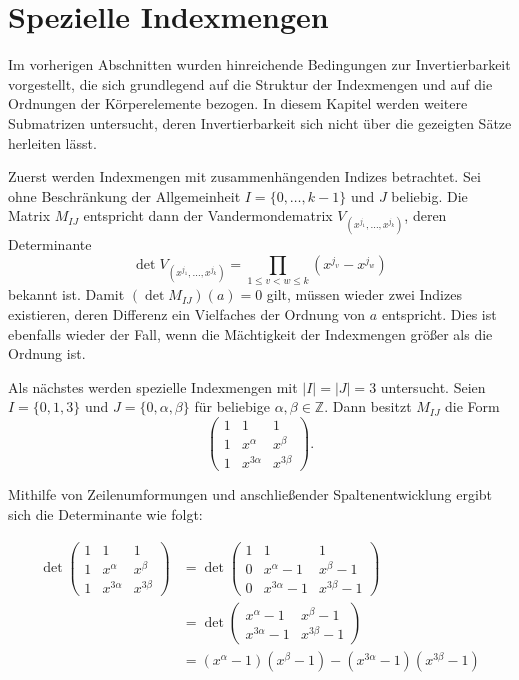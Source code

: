 \section{Spezielle Indexmengen}

Im vorherigen Abschnitten wurden hinreichende Bedingungen zur Invertierbarkeit vorgestellt, die sich grundlegend auf die Struktur der Indexmengen und auf die Ordnungen der Körperelemente bezogen. In diesem Kapitel werden weitere Submatrizen untersucht, deren Invertierbarkeit sich nicht über die gezeigten Sätze herleiten lässt.

Zuerst werden Indexmengen mit zusammenhängenden Indizes betrachtet. Sei ohne Beschränkung der Allgemeinheit $I = \{0,\dots,k-1\}$ und $J$ beliebig. Die Matrix $M_{IJ}$ entspricht dann der Vandermondematrix $V_{(x^{j_1},\dots,x^{j_k})}$, deren Determinante
\begin{equation*}
    \det V_{(x^{j_1},\dots,x^{j_k})} = \prod_{1\leq v<w\leq k} (x^{j_v} - x^{j_w})
\end{equation*}
bekannt ist. Damit $(\det M_{IJ})(a) = 0$ gilt, müssen wieder zwei Indizes existieren, deren Differenz ein Vielfaches der Ordnung von $a$ entspricht. Dies ist ebenfalls wieder der Fall, wenn die Mächtigkeit der Indexmengen größer als die Ordnung ist.


Als nächstes werden spezielle Indexmengen mit $|I| = |J| = 3$ untersucht. Seien $I = \{0, 1, 3\}$ und $J = \{0, \alpha, \beta\}$ für beliebige $\alpha,\beta \in \mathbb{Z}$. Dann besitzt $M_{IJ}$ die Form 
\begin{equation*}
    \begin{pmatrix}
        1 & 1 & 1 \\
        1 & x^{\alpha} & x^{\beta} \\
        1 & x^{3\alpha} & x^{3\beta}
    \end{pmatrix}.
\end{equation*}

Mithilfe von Zeilenumformungen und anschließender Spaltenentwicklung ergibt sich die Determinante wie folgt:

\begin{align*}
    \det \begin{pmatrix}
        1 & 1 & 1 \\
        1 & x^{\alpha} & x^{\beta} \\
        1 & x^{3\alpha} & x^{3\beta}
    \end{pmatrix}
    &= \det \begin{pmatrix}
        1 & 1 & 1 \\
        0 & x^{\alpha} -1 & x^{\beta} -1 \\
        0 & x^{3\alpha} -1 & x^{3\beta} -1
    \end{pmatrix} \\
    &= \det \begin{pmatrix}
        x^{\alpha} -1 & x^{\beta} -1 \\
        x^{3\alpha} -1 & x^{3\beta} -1
    \end{pmatrix} \\
    &= (x^{\alpha} -1)(x^{\beta} -1) - (x^{3\alpha} -1)(x^{3\beta} -1)
\end{align*}

